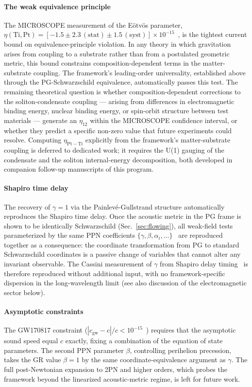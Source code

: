 \documentclass[12pt, a4paper]{article}
\begin{document}
\paragraph{The weak equivalence principle}
The MICROSCOPE measurement of the E\"otv\"os parameter, $\eta(\mathrm{Ti},\mathrm{Pt}) = [-1.5 \pm 2.3\,(\mathrm{stat}) \pm 1.5\,(\mathrm{syst})] \times 10^{-15}$~\cite{microscope_2022}, is the tightest current bound on equivalence-principle violation. In any theory in which gravitation arises from coupling to a substrate rather than from a postulated geometric metric, this bound constrains composition-dependent terms in the matter-substrate coupling. The framework's leading-order universality, established above through the PG-Schwarzschild equivalence, automatically passes this test. The remaining theoretical question is whether composition-dependent corrections to the soliton-condensate coupling --- arising from differences in electromagnetic binding energy, nuclear binding energy, or spin-orbit structure between test materials --- generate an $\eta_{12}$ within the MICROSCOPE confidence interval, or whether they predict a specific non-zero value that future experiments could resolve. Computing $\eta_{\mathrm{Pt-Ti}}$ explicitly from the framework's matter-substrate coupling is deferred to dedicated work; it requires the U(1) gauging of the condensate and the soliton internal-energy decomposition, both developed in companion follow-up manuscripts of this program.

\paragraph{Shapiro time delay}
The recovery of $\gamma = 1$ via the Painlev\'{e}-Gullstrand structure automatically reproduces the Shapiro time delay. Once the acoustic metric in the PG frame is shown to be identically Schwarzschild (Sec.~\ref{sec:flowing}), all weak-field tests parameterized by the same PPN coefficients $\{\gamma, \beta, \alpha_i, \ldots\}$~\cite{will_2014} are reproduced together as a consequence: the coordinate transformation from PG to standard Schwarzschild coordinates is a passive change of variables that cannot alter any invariant observable. The Cassini measurement of $\gamma$ from Shapiro delay timing~\cite{bertotti_2003} is therefore reproduced without additional input, with no framework-specific dispersion in the long-wavelength limit (see also discussion of the electromagnetic sector below).

\paragraph{Asymptotic constraints}
The GW170817 constraint ($|c_{\mathrm{gw}} - c|/c < 10^{-15}$~\cite{abbott_2017}) requires that the asymptotic sound speed equal $c$ exactly, fixing a combination of the equation of state parameters. The second PPN parameter $\beta$, controlling perihelion precession, takes the GR value $\beta = 1$ by the same coordinate-equivalence argument as $\gamma$. The full post-Newtonian expansion to 2PN and higher orders, which probes the framework beyond the linearized acoustic-metric regime, is left for future work.
\end{document}

